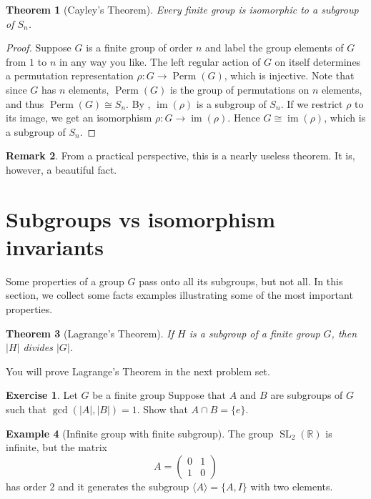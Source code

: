 \documentclass[12pt]{report}
\newtheorem{theorem}{Theorem}[chapter]
\numberwithin{equation}{section}
\numberwithin{theorem}{chapter}
\theoremstyle{definition}
\newtheorem{example}[theorem]{Example}
\newtheorem{exercise}{Exercise}
\newtheorem*{basic properties}{Basic Properties}
\newtheorem*{Important Remark}{Important Remark}
\newtheorem{remark}[theorem]{Remark}
\DeclareMathOperator{\SL}{SL}
\DeclareMathOperator{\Perm}{Perm}
\newcommand{\R}{\mathbb{R}}
\DeclareMathOperator{\im}{im}
\begin{document}
\begin{theorem}[Cayley's Theorem]
Every finite group is isomorphic to a subgroup of $S_n$. 
\end{theorem}

\begin{proof} 
Suppose $G$ is a finite group of order $n$ and label the group elements of $G$ from $1$ to $n$ in any way you like. The left regular action of $G$ on itself determines a permutation representation $\rho\!:G\to \Perm(G)$, which is injective. Note that since $G$ has $n$ elements, $\Perm(G)$ is the group of permutations on $n$ elements, and thus $\Perm(G) \cong S_n$. By , $\im(\rho)$ is a subgroup of $S_n$. If we restrict $\rho$ to its image, we get an isomorphism $\rho\!: G \to \im(\rho)$. Hence $G\cong \im(\rho)$, which is a subgroup of $S_n$. 
\end{proof}

\begin{remark}
From a practical perspective, this is a nearly useless theorem. It is, however, a beautiful fact.	
\end{remark}



\section{Subgroups vs isomorphism invariants}

Some properties of a group $G$ pass onto all its subgroups, but not all. In this section, we collect some facts examples illustrating some of the most important properties.



\begin{theorem}[Lagrange's Theorem]\label{Lagrange}
If $H$ is a subgroup of a finite group $G$, then $|H|$ divides $|G|$.
\end{theorem}

You will prove Lagrange's Theorem in the next problem set.


\begin{exercise}\label{intersection coprime subgroups is e}
	Let $G$ be a finite group Suppose that $A$ and $B$ are subgroups of $G$ such that $\gcd(|A|, |B|) = 1$. Show that $A \cap B = \{ e \}$.
\end{exercise}


\begin{example}[Infinite group with finite subgroup]\label{infinite group with infinite subgroup}
	The group $\SL_2(\R)$ is infinite, but the matrix
	$$A = \begin{pmatrix}
		0 & 1 \\ 1 & 0
	\end{pmatrix}$$
	has order $2$ and it generates the subgroup $\langle A \rangle = \{ A, I \}$ 	with two elements.
\end{example}
\end{document}
